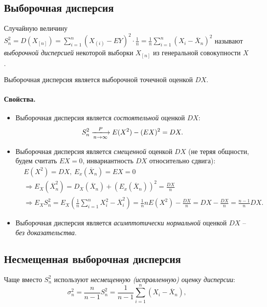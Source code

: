 \subsection{Выборочная дисперсия}

\begin{definition}
  Случайную величину $S^2_n = D(X_{[n]}) =
  \sum\limits_{i = 1}^{n} (X_{(i)} - EY)^2 \cdot \frac{1}{n} =
  \frac{1}{n} \sum\limits_{i = 1}^{n}(X_i - \overline{X}_n)^2$ называют
  \textit{выборочной дисперсией} некоторой выборки $X_{[n]}$ из генеральной
  совокупности $X$.
\end{definition}

Выборочная дисперсия является выборочной точечной оценкой $DX$.

\paragraph{Свойства.}
\begin{itemize}
  \item Выборочная дисперсия является \textit{состоятельной} оценкой $DX$:
  \[
    S^2_n \xlongrightarrow[n \to \infty]{P} E(X^2) - (EX)^2 = DX
  .\]

  \item Выборочная дисперсия является \textit{смещенной} оценкой $DX$ (не теряя
  общности, будем считать $EX = 0$, инвариантность $DX$ относительно сдвига):
  \begin{align*}
    &E(X^2) = DX,~ E_x(\overline{X}_n) = EX = 0\\
    &\Rightarrow E_X(\overline{X}^2_n) =
    D_X(\overline{X}_n) + (E_x(\overline{X}_n))^2 = \frac{DX}{n}\\
    &\Rightarrow E_X S^2_n =
    E_X(\frac{1}{n} \sum\limits_{i = 1}^{n} X^2_i - \overline{X}^2_i) =
    \frac{1}{n} n E(X^2) - \frac{DX}{n} = DX - \frac{DX}{n} =
    \frac{n - 1}{n} DX
  .\end{align*}

  \item Выборочная дисперсия является \textit{асимптотически нормальной}
  оценкой $DX$ -- \textit{без доказательства}.
\end{itemize}

\subsection{Несмещенная выборочная дисперсия}
\begin{definition}
  Чаще вместо $S^2_n$ используют \textit{несмещенную (исправленную) оценку
  дисперсии}:
  \[
    \sigma^2_n = \frac{n}{n - 1} S^2_n =
    \frac{1}{n - 1} \sum\limits_{i = 1}^{n} (X_i - \overline{X}_n)
  ,\]
\end{definition}

